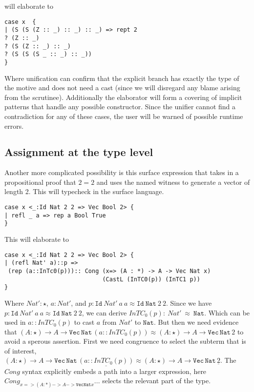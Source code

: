 will elaborate to
\begin{lstlisting}[basicstyle={\ttfamily\small}]
case x  {
| (S (S (Z :: _) :: _) :: _) => rept 2
? (Z :: _)
? (S (Z :: _) :: _)
? (S (S (S _ :: _) :: _))
}
\end{lstlisting}
 
Where unification can confirm that the explicit branch has exactly the type of the motive and does not need a cast (since we will disregard any blame arising from the scrutinee).
Additionally the elaborator will form a covering of implicit patterns that handle any possible constructor.
Since the unifier cannot find a contradiction for any of these cases, the user will be warned of possible runtime errors.
 
\subsection{Assignment at the type level}
 
Another more complicated possibility is this surface expression that takes in a propositional proof that $2=2$ and uses the named witness to generate a vector of length 2.
This will typecheck in the surface language.
 
\begin{lstlisting}[basicstyle={\ttfamily\small}]
case x <_:Id Nat 2 2 => Vec Bool 2> {
| refl _ a => rep a Bool True
}
\end{lstlisting}
 
This will elaborate to
 
\begin{lstlisting}[basicstyle={\ttfamily\small}]
case x <_:Id Nat 2 2 => Vec Bool 2> {
| (refl Nat' a)::p =>
 (rep (a::InTc0(p))):: Cong (x=> (A : *) -> A -> Vec Nat x)
                            (CastL (InTC0(p)) (InTC1 p))
}
\end{lstlisting}
 
Where $Nat':\star$, $a:Nat'$, and $p:\mathtt{Id}\ Nat'\ a\ a\approx\mathtt{Id}\ \mathtt{Nat}\ 2\ 2$.
Since we have $p:\mathtt{Id}\ Nat'\ a\ a\approx\mathtt{Id}\ \mathtt{Nat}\ 2\ 2$, we can derive $InTC_{0}(p):\ Nat'\ \approx\ \mathtt{Nat}$.
Which can be used in $a::InTC_{0}(p)$ to cast $a$ from $Nat'$ to $\mathtt{Nat}$.
But then we need evidence that $(A:\star)\rightarrow A\rightarrow\mathtt{Vec}\,\mathtt{Nat}\,(a::InTC_{0}(p))\approx(A:\star)\rightarrow A\rightarrow\mathtt{Vec}\,\mathtt{Nat}\,2$ to avoid a sperous assertion.
First we need congruence to select the subterm that is of interest, $(A:\star)\rightarrow A\rightarrow\mathtt{Vec}\,\mathtt{Nat}\,\underline{(a::InTC_{0}(p))}\approx(A:\star)\rightarrow A\rightarrow\mathtt{Vec}\,\mathtt{Nat}\,\underline{2}$.
The $Cong$ syntax explicitly embeds a path into a larger expression, here $Cong_{x=> (A : *) -> A -> \mathtt{Vec} \mathtt{Nat} x} ...$ selects the relevant part of the type.
 
